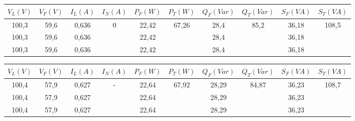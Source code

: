 \documentclass[a4paper,12pt,oneside,openany,table,xcdraw]{article}
\begin{document}
\begin{table}[H]\scriptsize
\centering
\def\arraystretch{1.35}
\captionsetup{font=scriptsize}
 \label{tab1}

\begin{tabular}{|c|c|c|c|c|c|c|c|c|c|}
\hline
$V_{L} (V)$ & $V_{F} (V)$ & $I_{L} (A)$ & $I_{N} (A)$        & $P_{F} (W)$ & $P_{T} (W)$       & $Q_{F} (Var)$ & $Q_{T} (Var)$     & $S_{F} (VA)$ & $S_{T} (VA)$      \\ \hline
100,3       & 59,6           & 0,636       & \multirow{3}{*}{0} & 22,42       & \multirow{3}{*}{67,26} & 28,4          & \multirow{3}{*}{85,2} &  36,18            & \multirow{3}{*}{108,5} \\ \cline{1-3} \cline{5-5} \cline{7-7} \cline{9-9}
100,3       & 59,6           &  0,636           &                    & 22,42       &                   & 28,4              &                   &   36,18            &                   \\ \cline{1-3} \cline{5-5} \cline{7-7} \cline{9-9}
100,3       & 59,6           &   0,636          &                    & 22,42       &                   &  28,4             &                   & 36,18              &                   \\ \hline
\end{tabular}
\end{table}

\begin{table}[H]\scriptsize
\centering
\def\arraystretch{1.35}
\captionsetup{font=scriptsize}
 \label{tab2}

\begin{tabular}{|c|c|c|c|c|c|c|c|c|c|}
\hline
$V_{L} (V)$ & $V_{F} (V)$  & $I_{L} (A)$ & $I_{N} (A)$        & $P_{F} (W)$ & $P_{T} (W)$       & $Q_{F} (Var)$ & $Q_{T} (Var)$     & $S_{F} (VA)$ & $S_{T} (VA)$      \\ \hline
100,4       & 57,9           & 0,627       & \multirow{3}{*}{-} & 22,64       & \multirow{3}{*}{67,92} & 28,29         & \multirow{3}{*}{84,87} &  36,23            & \multirow{3}{*}{108,7} \\ \cline{1-3} \cline{5-5} \cline{7-7} \cline{9-9}
100,4       & 57,9           & 0,627              &                    & 22,64       &                   &  28,29             &                   &   36,23                      &                   \\ \cline{1-3} \cline{5-5} \cline{7-7} \cline{9-9}
100,4       & 57,9           &  0,627             &                    & 22,64       &                   &  28,29             &                   &  36,23                       &                   \\ \hline
\end{tabular}
\end{table}
\end{document}

